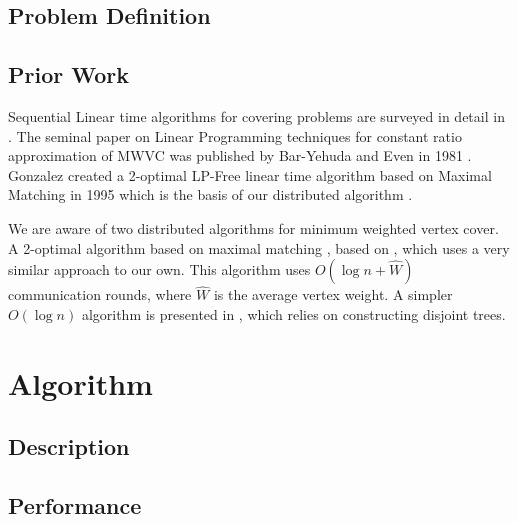 \documentclass[review ]{elsarticle}
\begin{document}
\subsection{Problem Definition}

\subsection{Prior Work}

Sequential Linear time algorithms for covering problems are surveyed in detail in \cite{254190}. The seminal paper on Linear Programming techniques for constant ratio approximation of MWVC was published by Bar-Yehuda and Even in 1981 \cite{Bar-Yehuda:1981lr}. Gonzalez created a 2-optimal LP-Free linear time algorithm based on Maximal Matching in 1995 which is the basis of our distributed algorithm \cite{Gonzalez1995129}. 

We are aware of two distributed algorithms for minimum weighted vertex cover. A 2-optimal algorithm based on maximal matching \cite{1435381}, based on \cite{Israel:1986:FSR:5361.5365}, which uses a very similar approach to our own. This algorithm uses $O(\log n + \hat{W})$ communication rounds, where $\hat{W}$ is the average vertex weight. A simpler $O(\log n)$ algorithm is presented in \cite{1582746}, which relies on constructing disjoint trees.

\section{Algorithm}
\subsection{Description}

\subsection{Performance}


\end{document}
